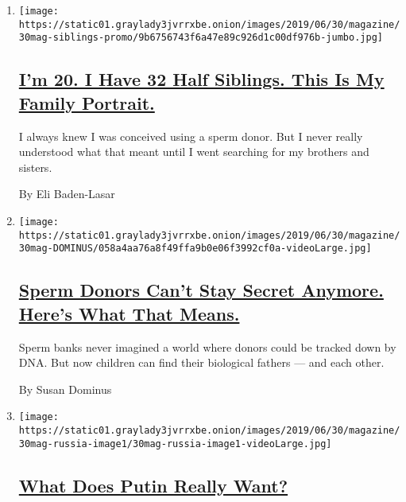 \begin{enumerate}
\def\labelenumi{\arabic{enumi}.}
\item
  \texttt{[image: https://static01.graylady3jvrrxbe.onion/images/2019/06/30/magazine/30mag-siblings-promo/9b6756743f6a47e89c926d1c00df976b-jumbo.jpg]}

  \hypertarget{im-20-i-have-32-half-siblings-this-is-my-family-portrait}{%
  \subsection{\texorpdfstring{\href{/interactive/2019/06/26/magazine/sperm-donor-siblings.html}{I'm
  20. I Have 32 Half Siblings. This Is My Family
  Portrait.}}{I'm 20. I Have 32 Half Siblings. This Is My Family Portrait.}}\label{im-20-i-have-32-half-siblings-this-is-my-family-portrait}}

  I always knew I was conceived using a sperm donor. But I never really
  understood what that meant until I went searching for my brothers and
  sisters.

  By Eli Baden-Lasar
\item
  \texttt{[image: https://static01.graylady3jvrrxbe.onion/images/2019/06/30/magazine/30mag-DOMINUS/058a4aa76a8f49ffa9b0e06f3992cf0a-videoLarge.jpg]}

  \hypertarget{sperm-donors-cant-stay-secret-anymore-heres-what-that-means}{%
  \subsection{\texorpdfstring{\href{/2019/06/26/magazine/sperm-donor-questions.html}{Sperm
  Donors Can't Stay Secret Anymore. Here's What That
  Means.}}{Sperm Donors Can't Stay Secret Anymore. Here's What That Means.}}\label{sperm-donors-cant-stay-secret-anymore-heres-what-that-means}}

  Sperm banks never imagined a world where donors could be tracked down
  by DNA. But now children can find their biological fathers --- and
  each other.

  By Susan Dominus
\item
  \texttt{[image: https://static01.graylady3jvrrxbe.onion/images/2019/06/30/magazine/30mag-russia-image1/30mag-russia-image1-videoLarge.jpg]}

  \hypertarget{what-does-putin-really-want}{%
  \subsection{\texorpdfstring{\href{/2019/06/25/magazine/russia-united-states-world-politics.html}{What
  Does Putin Really
  Want?}}{What Does Putin Really Want?}}\label{what-does-putin-really-want}}


\end{enumerate}
